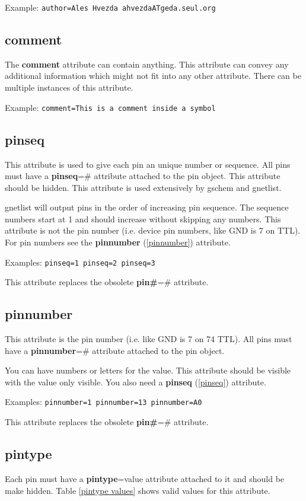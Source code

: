 \documentclass{article}
\begin{document}
Example: \texttt{author=Ales Hvezda ahvezdaATgeda.seul.org}


\subsection{\bf comment\label{comment}}
The {\bf comment} attribute can contain anything.  This attribute can
convey any additional information which might not fit into any other
attribute.  There can be multiple instances of this attribute.

Example: \texttt{comment=This is a comment inside a symbol}


\subsection{\bf pinseq\label{pinseq}}
This attribute is used to give each pin an unique number or sequence.
All pins must have a {\bf pinseq}=\# attribute attached to the pin object.
This attribute should be hidden.  This attribute is used extensively by
gschem and gnetlist.

gnetlist will output pins in the order of increasing pin sequence.
The sequence numbers start at 1 and should increase without skipping
any numbers.  This attribute is not the pin number (i.e. device pin
numbers, like GND is 7 on TTL).  For pin numbers see the {\bf pinnumber} (\ref{pinnumber}) attribute.  

Examples: \texttt{pinseq=1 pinseq=2 pinseq=3}

This attribute replaces the obsolete {\bf pin\#}=\# attribute.


\subsection{\bf pinnumber\label{pinnumber}}
This attribute is the pin number (i.e. like GND is 7 on 74 TTL).  
All pins must have a {\bf pinnumber}=\# attribute attached to the pin object.

You can have numbers or letters for the value.  This attribute should
be visible with the value only visible.  You also need a {\bf pinseq}
(\ref{pinseq}) attribute.

Examples: \texttt{pinnumber=1 pinnumber=13 pinnumber=A0}   

This attribute replaces the obsolete {\bf pin\#}=\# attribute.


\subsection{\bf pintype\label{pintype}}
Each pin must have a {\bf pintype}=value attribute attached to it and 
should be make hidden. Table \ref{pintype values} shows valid values for
this attribute.  
\end{document}
